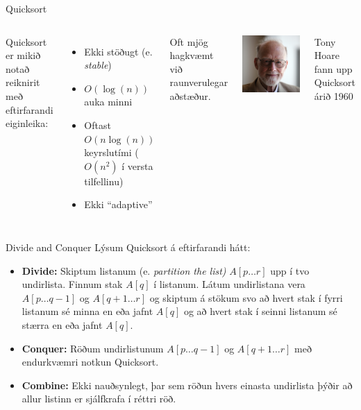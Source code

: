 \documentclass{beamer}
\begin{document}
\begin{frame}{Quicksort}
\pause
\begin{columns}[c]
Quicksort er mikið notað reiknirit með eftirfarandi eiginleika:
\begin{itemize}
 \item Ekki stöðugt (e. \emph{stable})
 \item $O(\log(n))$ auka minni
 \item Oftast $O(n\log(n))$ keyrslutími ($O(n^2)$ í versta tilfellinu)
 \item Ekki ``adaptive''
\end{itemize}
Oft mjög hagkvæmt við raunverulegar aðstæður.
\begin{center}
\includegraphics[width=\textwidth]{Pics/Hoare}
\end{center}
Tony Hoare fann upp Quicksort árið 1960
\end{columns}
\end{frame}

\begin{frame}{Divide and Conquer}
Lýsum Quicksort á eftirfarandi hátt:
\begin{itemize}
  \item \textbf{Divide:} Skiptum listanum (e. \emph{partition the list)} $A[p \ldots r]$ upp í tvo undirlista. Finnum stak $A[q]$ í listanum. Látum undirlistana vera $A[p \ldots q-1]$ og $A[q + 1 \ldots r]$ og skiptum á stökum svo að hvert stak í fyrri listanum sé minna en eða jafnt $A[q]$ og að hvert stak í seinni listanum sé stærra en eða jafnt $A[q]$.
  \item \textbf{Conquer:} Röðum undirlistunum $A[p \ldots q-1]$ og $A[q + 1 \ldots r]$ með endurkvæmri notkun Quicksort.
  \item \textbf{Combine:} Ekki nauðsynlegt, þar sem röðun hvers einasta undirlista þýðir að allur listinn er sjálfkrafa í réttri röð.
\end{itemize}
\end{frame}
\end{document}
